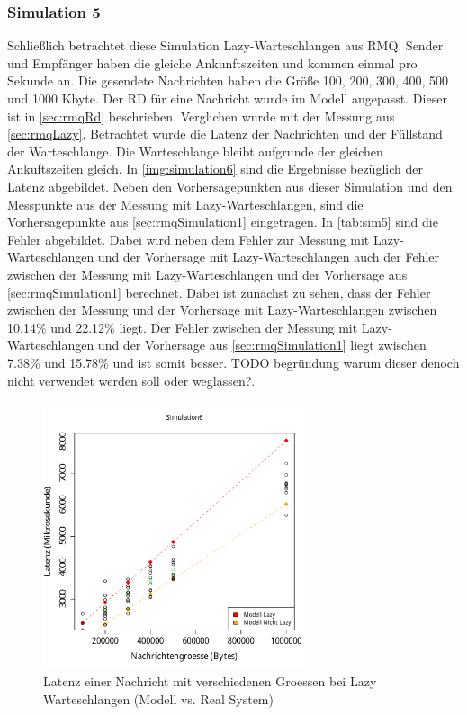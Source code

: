 \subsubsection{Simulation 5}
Schließlich betrachtet diese Simulation Lazy-Warteschlangen aus RMQ. Sender und Empfänger haben die gleiche Ankunftszeiten und kommen einmal pro Sekunde an. Die gesendete Nachrichten haben die Größe 100, 200, 300, 400, 500 und 1000 Kbyte. Der RD für eine Nachricht wurde im Modell angepasst. Dieser ist in \autoref{sec:rmqRd} beschrieben. Verglichen wurde mit der Messung aus \autoref{sec:rmqLazy}. Betrachtet wurde die Latenz der Nachrichten und der Füllstand der Warteschlange.
Die Warteschlange bleibt aufgrunde der gleichen Ankuftszeiten gleich. In \autoref{img:simulation6} sind die Ergebnisse bezüglich der Latenz abgebildet. Neben den Vorhersagepunkten aus dieser Simulation und den Messpunkte aus der Messung mit Lazy-Warteschlangen, sind die Vorhersagepunkte aus \autoref{sec:rmqSimulation1} eingetragen. In \autoref{tab:sim5} sind die Fehler abgebildet. Dabei wird neben dem Fehler zur Messung mit Lazy-Warteschlangen und der Vorhersage mit Lazy-Warteschlangen auch der Fehler zwischen der Messung mit Lazy-Warteschlangen und der Vorhersage aus \autoref{sec:rmqSimulation1} berechnet. Dabei ist zunächst zu sehen, dass der Fehler zwischen der Messung und der Vorhersage mit Lazy-Warteschlangen zwischen 10.14\% und 22.12\% liegt. Der Fehler zwischen der Messung mit Lazy-Warteschlangen und der Vorhersage aus \autoref{sec:rmqSimulation1} liegt zwischen 7.38\% und 15.78\% und ist somit besser. TODO begründung warum dieser denoch nicht verwendet werden soll oder weglassen?.
\begin{figure}
\center
  \includegraphics[width=0.7\textwidth]{images/modelSimulationResults/simulation6.pdf}
  \caption{Latenz einer Nachricht mit verschiedenen Groessen bei Lazy Warteschlangen (Modell vs. Real System)}
  \label{img:simulation6}
\end{figure}


